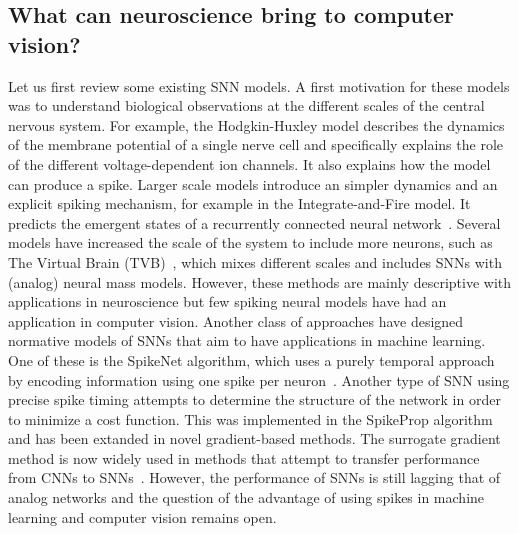 \documentclass[default]{sn-jnl}%
\theoremstyle{thmstyleone}%
\theoremstyle{thmstyletwo}%
\theoremstyle{thmstylethree}%
\begin{document}
\subsection{What can neuroscience bring to computer vision?}%
Let us first review some existing SNN models. A first motivation for these models was to understand biological observations at the different scales of the central nervous system. For example, the Hodgkin-Huxley model describes the dynamics of the membrane potential of a single nerve cell and specifically explains the role of the different voltage-dependent ion channels. It also explains how the model can produce a spike. Larger scale models introduce an simpler dynamics and an explicit spiking mechanism, for example in the Integrate-and-Fire model. It predicts the emergent states of a recurrently connected neural network~\citep{brunel_phase_2000}. Several models have increased the scale of the system to include more neurons, such as The Virtual Brain (TVB)~\citep{sanz_leon_virtual_2013}, which mixes different scales and includes SNNs with (analog) neural mass models. However, these methods are mainly descriptive with applications in neuroscience but few spiking neural models have had an application in computer vision. Another class of approaches have designed normative models of SNNs that aim to have applications in machine learning. One of these is the SpikeNet algorithm, which uses a purely temporal approach by encoding information using one spike per neuron~\citep{delorme_spikenet_1999}. Another type of SNN using precise spike timing attempts to determine the structure of the network in order to minimize a cost function. This was implemented in the SpikeProp algorithm~\citep{bohte_error-backpropagation_2002} and has been extanded in novel gradient-based methods. The surrogate gradient method is now widely used in methods that attempt to transfer performance from CNNs to SNNs~\citep{zenke_remarkable_2021}. However, the performance of SNNs is still lagging that of analog networks and the question of the advantage of using spikes in machine learning and computer vision remains open.
\end{document}
